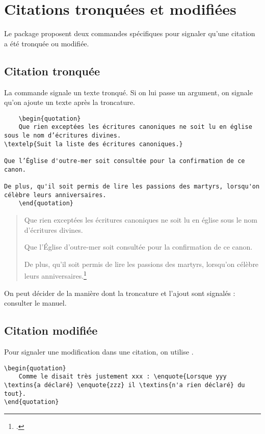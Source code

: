 \section{Citations tronquées et modifiées}

Le package  proposent deux commandes spécifiques pour signaler qu'une citation a été tronquée ou modifiée.

\subsection{Citation tronquée}

La commande  signale un texte tronqué. Si on lui passe un argument, on signale qu'on ajoute un texte après la troncature.

\begin{verbatim}
	\begin{quotation}
	Que rien exceptées les écritures canoniques ne soit lu en église sous le nom d’écritures divines.
\textelp{Suit la liste des écritures canoniques.}

Que l’Église d'outre-mer soit consultée pour la confirmation de ce canon.

De plus, qu'il soit permis de lire les passions des martyrs, lorsqu'on célèbre leurs anniversaires.
	\end{quotation}
\end{verbatim}

	\begin{quotation}
	Que rien exceptées les écritures canoniques ne soit lu en église sous le nom d’écritures divines.

Que l’Église d'outre-mer soit consultée pour la confirmation de ce canon.

De plus, qu'il soit permis de lire les passions des martyrs, lorsqu'on célèbre leurs anniversaires.\footcite{BreveHippone}
	\end{quotation}

\begin{anedocte}
On peut décider de la manière dont la troncature et l'ajout sont signalés : consulter le manuel.
\end{anedocte}

\subsection{Citation modifiée}

Pour signaler une modification dans une citation, on utilise  .
\begin{verbatim}
\begin{quotation}
	Comme le disait très justement xxx : \enquote{Lorsque yyy \textins{a déclaré} \enquote{zzz} il \textins{n'a rien déclaré} du tout}.
\end{quotation}
\end{verbatim}


